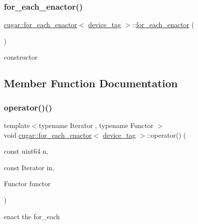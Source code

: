 \subsubsection{\texorpdfstring{for\+\_\+each\+\_\+enactor()}{for\_each\_enactor()}}
{\footnotesize\ttfamily \hyperlink{structcugar_1_1for__each__enactor}{cugar\+::for\+\_\+each\+\_\+enactor}$<$ \hyperlink{structcugar_1_1device__tag}{device\+\_\+tag} $>$\+::\hyperlink{structcugar_1_1for__each__enactor}{for\+\_\+each\+\_\+enactor} (\begin{DoxyParamCaption}{ }\end{DoxyParamCaption})\hspace{0.3cm}{\ttfamily [inline]}}

constructor 

\subsection{Member Function Documentation}
\mbox{\label{structcugar_1_1for__each__enactor_3_01device__tag_01_4_a560ef3acdf14e7bbccbdaea7cdae0049}} 
\subsubsection{\texorpdfstring{operator()()}{operator()()}\hspace{0.1cm}{\footnotesize\ttfamily [1/2]}}
{\footnotesize\ttfamily template$<$typename Iterator , typename Functor $>$ \\
void \hyperlink{structcugar_1_1for__each__enactor}{cugar\+::for\+\_\+each\+\_\+enactor}$<$ \hyperlink{structcugar_1_1device__tag}{device\+\_\+tag} $>$\+::operator() (\begin{DoxyParamCaption}\item[{const uint64}]{n,  }\item[{const Iterator}]{in,  }\item[{Functor}]{functor }\end{DoxyParamCaption})}

enact the for\+\_\+each \mbox{\label{structcugar_1_1for__each__enactor_3_01device__tag_01_4_a5ebd67b9c8303c8d3692dc8dbd336893}} 
